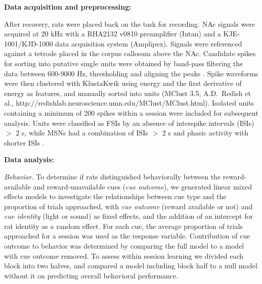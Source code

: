\documentclass[11pt]{article}
\let\cite=\citep
\begin{document}
{\bf Data acquisition and preprocessing:}

After recovery, rats were placed back on the task for recording. NAc
signals were acquired at 20 kHz with a RHA2132 v0810 preamplifier
(Intan) and a KJE-1001/KJD-1000 data acquisition system
(Amplipex). Signals were referenced against a tetrode placed in the
corpus callosum above the NAc. Candidate spikes for sorting into
putative single units were obtained by band-pass filtering the data
between 600-9000 Hz, thresholding and aligning the peaks \cite[UltraMegaSort2k, ][]{Hill2011}. Spike waveforms were then
clustered with KlustaKwik using energy and the first derivative of
energy as features, and manually sorted into units (MClust 3.5,
A.D.\ Redish et al., http://redishlab.neuroscience.umn.edu/MClust/MClust.html). Isolated units containing a minimum of 200
spikes within a session were included for subsequent analysis. Units
were classified as FSIs by an absence of
interspike intervals (ISIs) $>$ 2 s, while MSNs
had a combination of ISIs $>$ 2 s and phasic activity with shorter
ISIs \cite{Barnes2005,Atallah2014}.

{\bf Data analysis:}

{\it Behavior.} To determine if rats distinguished behaviorally
between the reward-available and reward-unavailable cues ({\it cue
outcome}), we generated linear mixed effects models to investigate
the relationships between cue type and the proportion of trials approached, with
{\it cue outcome} (reward available or not) and {\it cue identity}
(light or sound) as fixed effects, and the addition of an intercept
for rat identity as a random effect. For each cue, the average
proportion of trials approached for a session was
used as the response variable. Contribution of cue outcome to behavior
was determined by comparing the full model to a model with cue outcome
removed. To assess within session learning we divided each block into two halves, and compared a model including block half to a null model without it on predicting overall behavioral performance.
\end{document}
